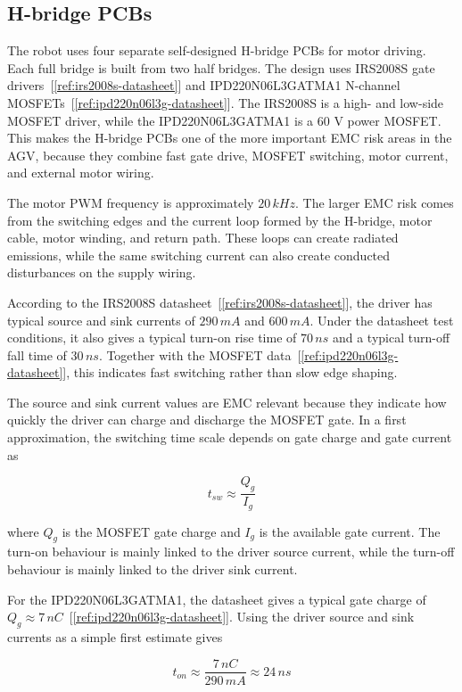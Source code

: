 \subsection{H-bridge PCBs}
The robot uses four separate self-designed H-bridge PCBs for motor driving. Each full
bridge is built from two half bridges. The design uses IRS2008S gate
drivers~[\ref{ref:irs2008s-datasheet}] and IPD220N06L3GATMA1 N-channel
MOSFETs~[\ref{ref:ipd220n06l3g-datasheet}]. The IRS2008S is a high- and low-side
MOSFET driver, while the IPD220N06L3GATMA1 is a 60 V power MOSFET. This makes
the H-bridge PCBs one of the more important EMC risk areas in the AGV, because they
combine fast gate drive, MOSFET switching, motor current, and external motor wiring.

The motor PWM frequency is approximately \(20\,kHz\). The larger EMC risk comes from
the switching edges and the current loop formed by the H-bridge, motor cable, motor
winding, and return path. These loops can create radiated emissions, while the same
switching current can also create conducted disturbances on the supply wiring.

According to the IRS2008S datasheet~[\ref{ref:irs2008s-datasheet}], the driver has
typical source and sink currents of \(290\,mA\) and \(600\,mA\). Under the datasheet
test conditions, it also gives a typical turn-on rise time of \(70\,ns\) and a typical
turn-off fall time of \(30\,ns\). Together with the MOSFET data~[\ref{ref:ipd220n06l3g-datasheet}],
this indicates fast switching rather than slow edge shaping.

The source and sink current values are EMC relevant because they indicate how quickly
the driver can charge and discharge the MOSFET gate. In a first approximation, the
switching time scale depends on gate charge and gate current as

\begin{equation}
t_{sw} \approx \frac{Q_g}{I_g}
\end{equation}

where \(Q_g\) is the MOSFET gate charge and \(I_g\) is the available gate current.
The turn-on behaviour is mainly linked to the driver source current, while the
turn-off behaviour is mainly linked to the driver sink current.

For the IPD220N06L3GATMA1, the datasheet gives a typical gate charge of
\(Q_g \approx 7\,nC\)~[\ref{ref:ipd220n06l3g-datasheet}]. Using the driver source and
sink currents as a simple first estimate gives

\begin{equation}
t_{on} \approx \frac{7\,nC}{290\,mA} \approx 24\,ns
\end{equation}

